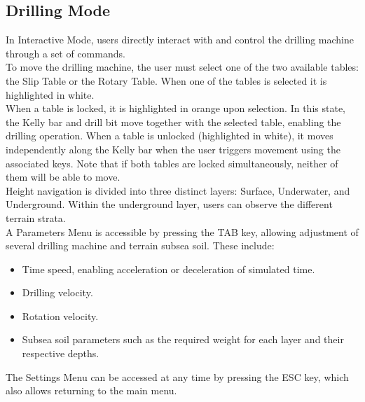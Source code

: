 \documentclass{article}
\begin{document}
\subsection{Drilling Mode}\hfill

In Interactive Mode, users directly interact with and control the drilling machine through a set of commands.\\

To move the drilling machine, the user must select one of the two available tables: the Slip Table or the Rotary Table. When one of the tables is selected it is highlighted in white.\\

When a table is locked, it is highlighted in orange upon selection. In this state, the Kelly bar and drill bit move together with the selected table, enabling the drilling operation. When a table is unlocked (highlighted in white), it moves independently along the Kelly bar when the user triggers movement using the associated keys. Note that if both tables are locked simultaneously, neither of them will be able to move.\\

Height navigation is divided into three distinct layers: Surface, Underwater, and Underground. Within the underground layer, users can observe the different terrain strata.\\

A Parameters Menu is accessible by pressing the TAB key, allowing adjustment of several drilling machine and terrain subsea soil. These include:
\begin{itemize}
    \item Time speed, enabling acceleration or deceleration of simulated time.
    \item Drilling velocity.
    \item Rotation velocity.
    \item Subsea soil parameters such as the required weight for each layer and their respective depths.
\end{itemize}

The Settings Menu can be accessed at any time by pressing the ESC key, which also allows returning to the main menu.\\
\end{document}
